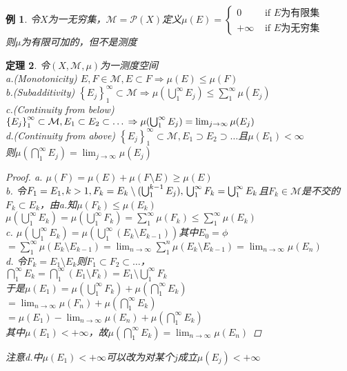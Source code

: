 \documentclass[12pt, a4paper, oneside]{ctexbook}
\newtheorem{theorem}{定理}[section]
\newtheorem{example}[theorem]{例}
\begin{document}
\begin{example}
    令$X$为一无穷集，$\mathcal{M}=\mathcal{P}(X)$定义$\mu(E)=\begin{cases}
        0& \text{ if } E\text{为有限集} \\
        +\infty& \text{ if } E\text{为无穷集}
      \end{cases}$\\
      则$\mu$为有限可加的，但不是测度
\end{example}
\begin{theorem}
    令$(X,\mathcal{M},\mu)$为一测度空间\\
    a.(Monotonicity) $E,F\in\mathcal{M},E\subset F\Rightarrow\mu(E)\leq\mu(F)$\\
    b.(Subadditivity) $\left\{E_j\right\}_1^{\infty}\subset\mathcal{M}\Rightarrow\mu(\bigcup_1^{\infty}E_j)\leq\sum_1^{\infty}\mu(E_j)$\\
    c.(Continuity from below) $\left\{E_j\right\}_1^{\infty}\subset\mathcal{M},E_1\subset E_2\subset\dots\\
    \Rightarrow\mu(\bigcup_1^{\infty}E_j)=\lim_{j \to \infty}\mu(E_j) $\\
    d.(Continuity from above) $\left\{E_j\right\}_1^{\infty}\subset\mathcal{M},E_1\supset E_2\supset\dots$且$\mu(E_1)<\infty$\\
    则$\mu(\bigcap_1^{\infty}E_j)=\lim_{j \to \infty}\mu(E_j)$
    \begin{proof}
        a. $\mu(F)=\mu(E)+\mu(F\setminus E)\geq\mu(E)$\\
        b. 令$F_1=E_1,k>1,F_k=E_k\setminus(\bigcup_1^{k-1}E_j),\\
        \bigcup_1^{\infty}F_k=\bigcup_1^{\infty}E_k$且$F_k\in\mathcal{M}$是不交的\\
        $F_k\subset E_k$，由a.知$\mu(F_k)\leq\mu(E_k)$\\
        $\mu(\bigcup_1^{\infty}E_k)=\mu(\bigcup_1^{\infty}F_k)=\sum_1^{\infty}\mu(F_k)\leq\sum_1^{\infty}\mu(E_k)$\\
        c. $\mu(\bigcup_1^{\infty}E_k)=\mu(\bigcup_1^{\infty}(E_k\setminus E_{k-1}))$其中$E_0=\phi$\\
        $=\sum_1^{\infty}\mu(E_k\setminus E_{k-1})=\lim_{n \to \infty}\sum_1^n\mu(E_k\setminus E_{k-1})=\lim_{n \to \infty}\mu(E_n)$\\
        d. 令$F_k=E_1\setminus E_k$则$F_1\subset F_2\subset\dots$，\\
        $\bigcap_1^{\infty}E_k=\bigcap_1^{\infty}(E_1\setminus F_k)=E_1\setminus\bigcup_1^{\infty}F_k$\\
        于是$\mu(E_1)=\mu(\bigcup_1^{\infty}F_k)+\mu(\bigcap_1^{\infty}E_k)$\\
        $=\lim_{n \to \infty}\mu(F_n)+\mu(\bigcap_1^{\infty}E_k)$\\
        $=\mu(E_1)-\lim_{n \to \infty}\mu(E_n)+\mu(\bigcap_1^{\infty}E_k)$\\
        其中$\mu(E_1)<+\infty$，故$\mu(\bigcap_1^{\infty}E_k)=\lim_{n \to \infty}\mu(E_n)$
    \end{proof}
    注意d.中$\mu(E_1)<+\infty$可以改为对某个$j$成立$\mu(E_j)<+\infty$
\end{theorem}
\end{document}
